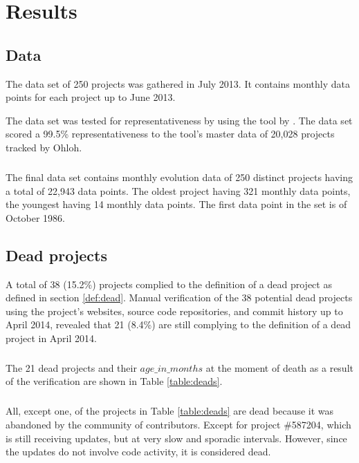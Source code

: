 \chapter{Results}
\label{results}

\section{Data}
The data set of 250 projects was gathered in July 2013. It contains monthly
data points for each project up to June 2013.

The data set was tested for representativeness by using the tool by
\citet{nagappan}. The data set scored a 99.5\% representativeness to the tool's
master data of 20,028 projects tracked by Ohloh.

\paragraph{}
The final data set contains monthly evolution data of 250 distinct projects
having a total of 22,943 data points. The oldest project having 321 monthly
data points, the youngest having 14 monthly data points. The first data point
in the set is of October 1986.

\section{Dead projects}
\label{section:deads}
A total of 38 (15.2\%) projects complied to the definition of a dead project as
defined in section \ref{def:dead}. Manual verification of the 38 potential
dead projects using the project's websites, source code repositories, and
commit history up to April 2014, revealed that 21 (8.4\%) are still complying
to the definition of a dead project in April 2014.

\paragraph{}
The 21 dead projects and their $age\_in\_months$ at the moment of death as a
result of the verification are shown in Table \ref{table:deads}.



\paragraph{}
All, except one, of the projects in Table \ref{table:deads} are dead because it
was abandoned by the community of contributors. Except for project \#587204,
which is still receiving updates, but at very slow and sporadic intervals.
However, since the updates do not involve code activity, it is considered dead.

